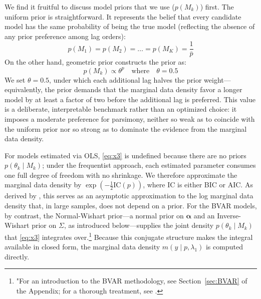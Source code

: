 \documentclass[12pt, a4paper]{article}
\begin{document}
We find it fruitful to discuss model priors that we use ($p(M_k)$) first. The uniform prior is straightforward. It represents the belief that every candidate model has the same probability of being the true model (reflecting the absence of any prior preference among lag orders):
\begin{equation} \label{eq:x4}
p(M_1) = p(M_2) = \dots = p(M_K) = \frac{1}{\bar p}
\end{equation}
On the other hand, geometric prior constructs the prior as:
\begin{equation} \label{eq:x5}
p(M_k) \propto \theta^p \quad \text{where} \quad \theta=0.5
\end{equation}
We set $\theta = 0.5$, under which each additional lag halves the prior weight---equivalently, the prior demands that the marginal data density favor a longer model by at least a factor of two before the additional lag is preferred. This value is a deliberate, interpretable benchmark rather than an optimized choice: it imposes a moderate preference for parsimony, neither so weak as to coincide with the uniform prior nor so strong as to dominate the evidence from the marginal data density.

For models estimated via OLS, \eqref{eq:x3} is undefined because there are no priors $p(\theta_k \mid M_k)$; under the frequentist approach, each estimated parameter consumes one full degree of freedom with no shrinkage. We therefore approximate the marginal data density by $\exp\left(-\frac{1}{2}\mathrm{IC}(p)\right)$, where $\mathrm{IC}$ is either BIC or AIC. As derived by \citet{schwarzEstimatingDimensionModel1978,rafteryBayesianModelSelection1995}, this serves as an asymptotic approximation to the log marginal data density that, in large samples, does not depend on a prior. For the BVAR models, by contrast, the Normal-Wishart prior—a normal prior on $\boldsymbol{\alpha}$ and an Inverse-Wishart prior on $\Sigma$, as introduced below—supplies the joint density $p(\theta_k \mid M_k)$ that \eqref{eq:x3} integrates over.\footnote{"For an introduction to the BVAR methodology, see Section~\ref{sec:BVAR} of the Appendix; for a thorough treatment, see \citet{AydinBVAR2026}.} Because this conjugate structure makes the integral available in closed form, the marginal data density $m(y \mid p,\lambda_1)$ is computed directly.
\end{document}
